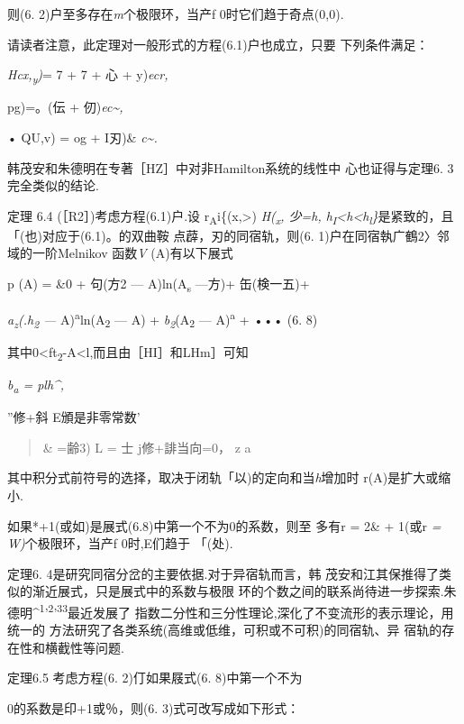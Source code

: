 \documentclass{article}
\begin{document}
则(6. 2)户至多存在\emph{m}个极限环，当产f 0时它们趋于奇点(0,0).

请读者注意，此定理对一般形式的方程(6.1)户也成立，只要 下列条件满足：

\emph{Hcx,\textsubscript{y})}= 7 + 7 + 心 + y)\emph{ecr,}

pg)=。(伝\textbar{} + 仞)\emph{ec\textasciitilde{},}

• QU,v) = og\textbar{} + I刃)\& \emph{c\textasciitilde{}.}

韩茂安和朱德明在专著［HZ］中对非Hamilton系统的线性中 心也证得与定理6.
3完全类似的结论.

定理 6.4 (［R2］)考虑方程(6.1)户.设
r\textsubscript{A}i\{(x,\textgreater{})\textbar{}
\emph{H(\textsubscript{x}, 少=h,
h\textsubscript{I}\textless{}h\textless{}h\textsubscript{l}\}}是紧致的，且「(也)对应于(6.1)。的双曲鞍
点薜，刃的同宿轨，则(6. 1)户在同宿執广鶴2〉邻域的一阶Melnikov
函数\emph{V} (A)有以下展式

p (A) = \&0 + 句(方2 --- A)ln(A\textsubscript{s} ---方)+ 缶(検一五)+

\emph{a\textsubscript{z}(.h\textsubscript{2} ---}
A)\textsuperscript{a}ln(A\textsubscript{2} --- A) +
\emph{b\textsubscript{2}}(A\textsubscript{2} --- A)\textsuperscript{a} +
••• (6. 8)

其中0\textless{}ft\textsubscript{2}-A\textless{}l,而且由［HI］和LHm］可知

\emph{b\textsubscript{a} = plh\^{},}

''修+斜 E頒是非零常数'

\begin{quote}
\& =齢3) L = 士 j修+誹当向=0， z a
\end{quote}

其中积分式前符号的选择，取决于闭轨「以)的定向和当\emph{h}增加时
r(A)是扩大或缩小.

如果*+1(或如)是展式(6.8)中第一个不为0的系数，则至 多有r = 2\& + 1(或r
\emph{= W)}个极限环，当产f 0时,E们趋于 「(处).

定理6. 4是研究同宿分岔的主要依据.对于异宿轨而言，韩
茂安和江其保推得了类似的渐近展式，只是展式中的系数与极限
环的个数之间的联系尚待进一步探索.朱德明\^{}\textsuperscript{1}'\textsuperscript{2}'\textsuperscript{33}最近发展了
指数二分性和三分性理论,深化了不变流形的表示理论，用统一的
方法研究了各类系统(高维或低维，可积或不可积)的同宿轨、异
宿轨的存在性和横截性等问题.

定理6.5 考虑方程(6. 2)仃如果屐式(6. 8)中第一个不为

0的系数是印+1或％，则(6. 3)式可改写成如下形式：
\end{document}
